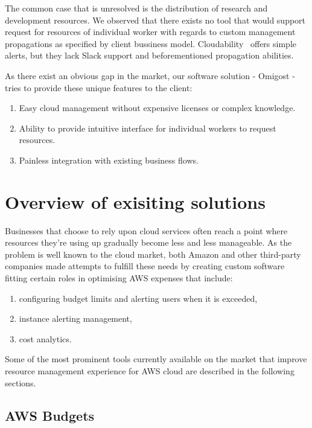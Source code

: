 \documentclass[licencjacka,en]{thesisclass}
\begin{document}
        The common case that is unresolved is the distribution of research and development resources.
        We observed that there exists no tool that would support request for resources of individual worker with regards to custom management propagations as specified by client bussiness model.
        Cloudability~\cite{CloudabilityAlerts} offers simple alerts, but they lack Slack support and beforementioned propagation abilities.

        As there exist an obvious gap in the market, our software solution - Omigost - tries to provide these unique features to the client:

        \begin{enumerate}
            \item Easy cloud management without expensive licenses or complex knowledge.
            \item Ability to provide intuitive interface for individual workers to request resources.
            \item Painless integration with existing business flows.
        \end{enumerate}

    \section{Overview of exisiting solutions}
    
        Businesses that choose to rely upon cloud services often reach a point where resources
	they’re using up gradually become less and less manageable. As the problem is well known
	to the cloud market, both Amazon and other third-party companies made attempts to fulfill
these needs by creating custom software fitting certain roles in optimising AWS expenses that include:        

        \begin{enumerate}
		\item configuring budget limits and alerting users when it is exceeded,
		\item instance alerting management,
		\item cost analytics.
        \end{enumerate}

        Some of the most prominent tools currently available on the market that improve resource management experience for AWS cloud are described in the following sections.
        
        \subsection{AWS Budgets}
\end{document}
